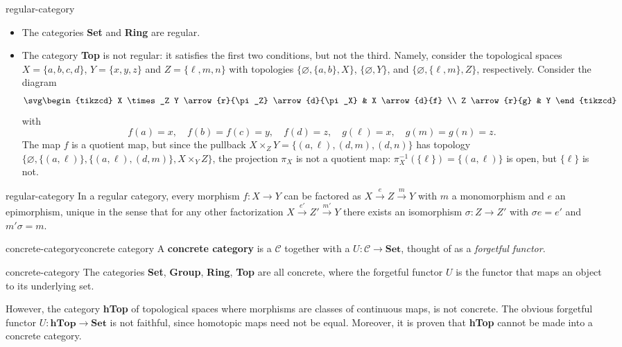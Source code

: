 \begin{example}{regular-category}
    \begin{itemize}
        \item The categories \textbf{Set} and \textbf{Ring} are regular.
        \item The category \textbf{Top} is not regular: it satisfies the first two conditions, but not the third. Namely, consider the topological spaces $X = \{ a, b, c, d \}$, $Y = \{ x, y, z \}$ and $Z = \{ \ell, m, n \}$ with topologies $\{ \varnothing, \{ a, b \}, X \}$, $\{ \varnothing, Y \}$, and $\{ \varnothing, \{ \ell, m \}, Z \}$, respectively. Consider the diagram
        \[ \svg \begin{tikzcd} X \times_Z Y \arrow{r}{\pi_Z} \arrow{d}{\pi_X} & X \arrow{d}{f} \\ Z \arrow{r}{g} & Y \end{tikzcd} \]
        with
        \[ f(a) = x, \quad f(b) = f(c) = y, \quad f(d) = z, \quad g(\ell) = x, \quad g(m) = g(n) = z . \]
        The map $f$ is a quotient map, but since the pullback $X \times_Z Y = \{ (a, \ell), (d, m), (d, n) \}$ has topology $\{ \varnothing, \{ (a, \ell) \}, \{ (a, \ell), (d, m) \} , X \times_Y Z \}$, the projection $\pi_X$ is not a quotient map: $\pi_X^{-1}(\{ \ell \}) = \{ (a, \ell) \}$ is open, but $\{ \ell \}$ is not.
    \end{itemize}
\end{example}

\begin{example}{regular-category}
    In a regular category, every morphism $f : X \to Y$ can be factored as $X \xrightarrow{e} Z \xrightarrow{m} Y$ with $m$ a monomorphism and $e$ an epimorphism, unique in the sense that for any other factorization $X \xrightarrow{e'} Z' \xrightarrow{m'} Y$ there exists an isomorphism $\sigma : Z \to Z'$ with $\sigma e = e'$ and $m' \sigma = m$.
\end{example}

\begin{topic}{concrete-category}{concrete category}
    A \textbf{concrete category} is a  $\mathcal{C}$ together with a  $U : \mathcal{C} \to \textbf{Set}$, thought of as a \textit{forgetful functor}.
\end{topic}

\begin{example}{concrete-category}
    The categories \textbf{Set}, \textbf{Group}, \textbf{Ring}, \textbf{Top} are all concrete, where the forgetful functor $U$ is the functor that maps an object to its underlying set.
    
    However, the category \textbf{hTop} of topological spaces where morphisms are  classes of continuous maps, is not concrete. The obvious forgetful functor $U : \textbf{hTop} \to \textbf{Set}$ is not faithful, since homotopic maps need not be equal. Moreover, it is proven that \textbf{hTop} cannot be made into a concrete category.
\end{example}

